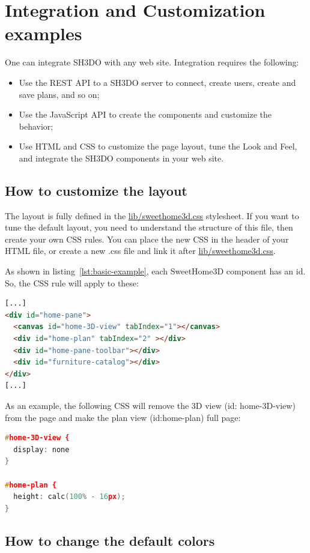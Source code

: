 \documentclass[a4paper]{report}
\begin{document}
\chapter{Integration and Customization examples} 

One can integrate SH3DO with any web site. Integration requires the following:

\begin{itemize}
\item Use the REST API to a SH3DO server to connect, create users, create and save plans, and so on;
\item Use the JavaScript API to create the components and customize the behavior;
\item Use HTML and CSS to customize the page layout, tune the Look and Feel, and integrate the SH3DO components in your web site.
\end{itemize}

\section{How to customize the layout}

The layout is fully defined in the \url{lib/sweethome3d.css} stylesheet. If you want to tune the default layout, you need to understand the structure of this file, then create your own CSS rules. You can place the new CSS in the header of your HTML file, or create a new .css file and link it after \url{lib/sweethome3d.css}.

As shown in listing~\ref{lst:basic-example}, each SweetHome3D component has an id. So, the CSS rule will apply to these:

\begin{lstlisting}[language=html]
[...]
<div id="home-pane">
  <canvas id="home-3D-view" tabIndex="1"></canvas>
  <div id="home-plan" tabIndex="2" ></div>
  <div id="home-pane-toolbar"></div>
  <div id="furniture-catalog"></div>
</div>
[...]
\end{lstlisting}

As an example, the following CSS will remove the 3D view (id: home-3D-view) from the page and make the plan view (id:home-plan)  full page:

\begin{lstlisting}[language=c]
#home-3D-view {
  display: none
}

#home-plan {
  height: calc(100% - 16px);
}
\end{lstlisting}

\section{How to change the default colors}
\end{document}
